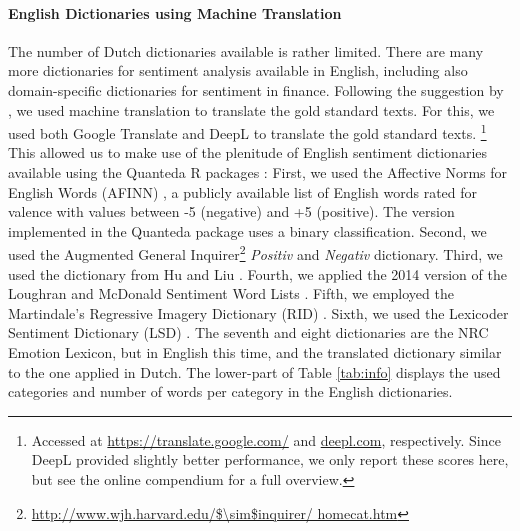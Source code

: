 \paragraph{English Dictionaries using Machine Translation}
The number of Dutch dictionaries available is rather limited. 
There are many more dictionaries for sentiment analysis available in English, 
including also domain-specific dictionaries for sentiment in finance.
Following the suggestion by \cite{devries2018}, we used machine translation to translate the gold standard texts.
For this, we used both Google Translate and DeepL to translate the gold standard texts.%
\footnote{Accessed at \url{https://translate.google.com/} and \url{deepl.com}, respectively. Since DeepL provided slightly better performance, we only report these scores here, but see the online compendium for a full overview. }
This allowed us to make use of the plenitude of English sentiment dictionaries available using the Quanteda R packages \citep{quanteda}:
First, we used the Affective Norms for English Words (AFINN) \citep{afinn}, a publicly available list of English words rated for valence with values between -5 (negative) and +5 (positive). The version implemented in the Quanteda package uses a binary classification. %
Second, we used the Augmented General Inquirer\footnote{\url{http://www.wjh.harvard.edu/$\sim$inquirer/ homecat.htm}} \textit{Positiv} and \textit{Negativ} dictionary.
Third, we used the dictionary %
from Hu and Liu \citep{hu2004,liu2005}.
Fourth, we applied the 2014 version of the Loughran and McDonald Sentiment Word Lists \citep{loughran2011}. 
Fifth, we employed the Martindale's Regressive Imagery Dictionary (RID) \citep{martindale1975, martindale1992}.
Sixth, we used the Lexicoder Sentiment Dictionary (LSD) \citep{lexicoder,young12}.
The seventh and eight dictionaries are the NRC Emotion Lexicon, but in English this time, and the translated \cite{damstra2018} dictionary similar to the one applied in Dutch.
The lower-part of Table \ref{tab:info} displays the used categories and number of words per category in the English dictionaries.

